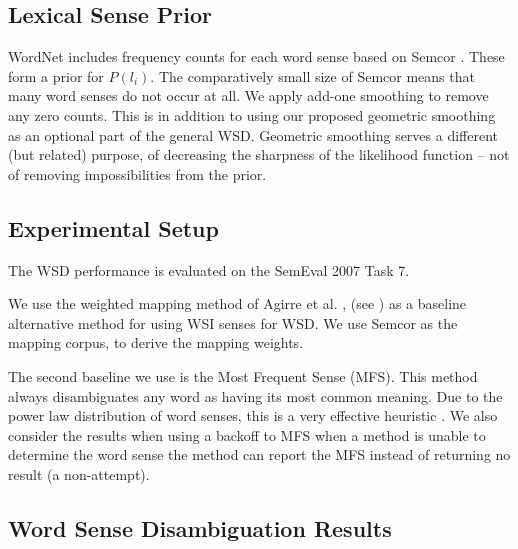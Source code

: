 {\subsection{Lexical Sense Prior}
WordNet includes frequency counts for each word sense based on Semcor \parencite{tengi1998design}.
These form a prior for $P(l_i)$.
The comparatively small size of Semcor means that many word senses do not occur at all.
We apply add-one smoothing to remove any zero counts.
This is in addition to using our proposed geometric smoothing as an optional part of the general WSD.
Geometric smoothing serves a different (but related) purpose, of decreasing the sharpness of the likelihood function -- not of removing impossibilities from the prior.

\subsection {Experimental Setup}
The WSD performance is evaluated on the SemEval 2007 Task 7.

We use the weighted mapping method of Agirre et al. \parencite{agirre2006}, (see ) as a baseline alternative method for using WSI senses for WSD.
We use Semcor as the mapping corpus, to derive the mapping weights.

The second baseline we use is the Most Frequent Sense (MFS).
This method always disambiguates any word as having its  most common meaning.
Due to the power law distribution of word senses, this is a very effective heuristic \parencite{Kilgarriff2004}.
We also consider the results when using a backoff to MFS when a method is unable to determine the word sense the method can report the MFS instead of returning no result (a non-attempt).


\subsection{Word Sense Disambiguation Results} \label{WSDtask}
\begin{table}
	\centering
	\begin{adjustbox}{max width=\columnwidth}
	\end{adjustbox}


\end{table}}

